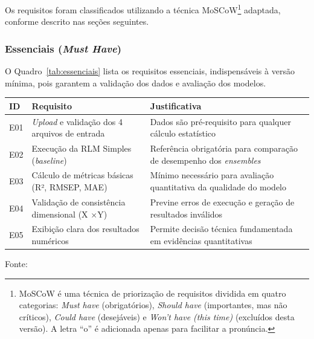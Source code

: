 Os requisitos foram classificados utilizando a técnica \gls{MoSCoW}\footnote{MoSCoW é uma técnica de priorização de requisitos dividida em quatro categorias: \textit{Must have} (obrigatórios), \textit{Should have} (importantes, mas não críticos), \textit{Could have} (desejáveis) e \textit{Won’t have (this time)} (excluídos desta versão). A letra “o” é adicionada apenas para facilitar a pronúncia.}\cite{clegg1994moscow} adaptada, conforme descrito nas seções seguintes.


\subsubsection{Essenciais (\textit{Must Have})}
\label{ssubsec:essenciais}

O Quadro~\ref{tab:essenciais} lista os requisitos essenciais, indispensáveis à versão mínima, pois garantem a validação dos dados e avaliação dos modelos.

\begin{quadro}[ht]
\begin{center}
\small
\captionsetup{justification=centering, labelsep=endash, width=0.75\linewidth}
\caption{Requisitos essenciais do sistema.}
\label{tab:essenciais}
\begin{threeparttable}
\begin{tabularx}{\textwidth}{|l|X|X|} \hline
\textbf{ID} & \textbf{Requisito} & \textbf{Justificativa} \\ \hline
E01 & \textit{Upload} e validação dos 4 arquivos de entrada & Dados são pré-requisito para qualquer cálculo estatístico \\ \hline
E02 & Execução da RLM Simples (\textit{baseline}) & Referência obrigatória para comparação de desempenho dos \textit{ensembles} \\ \hline
E03 & Cálculo de métricas básicas (R², RMSEP, MAE) & Mínimo necessário para avaliação quantitativa da qualidade do modelo \\ \hline
E04 & Validação de consistência dimensional (X $\times$Y) & Previne erros de execução e geração de resultados inválidos \\ \hline
E05 & Exibição clara dos resultados numéricos & Permite decisão técnica fundamentada em evidências quantitativas \\ \hline
\end{tabularx}
\begin{tablenotes}[flushleft]
\footnotesize
\item Fonte:~\oautor
\end{tablenotes}
\end{threeparttable}
\end{center}
\end{quadro}


